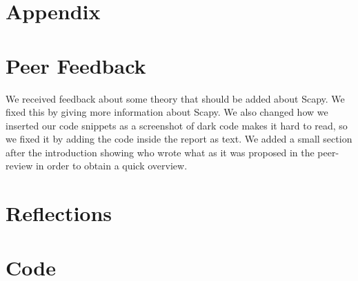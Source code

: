 \section{Appendix}

\section{Peer Feedback}
We received feedback about some theory that should be added about Scapy. We fixed this by giving more information about Scapy.
We also changed how we inserted our code snippets as a screenshot of dark code makes it hard to read, so we fixed it by adding the code inside the report as text. 
We added a small section after the introduction showing who wrote what as it was proposed in the peer-review in order to obtain a quick overview.

\section{Reflections}

\section{Code}


